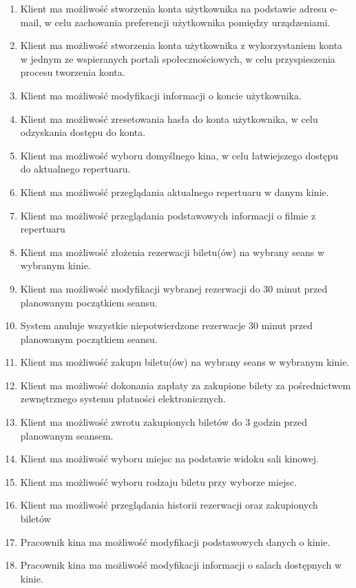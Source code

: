 \begin{enumerate}
\item Klient ma możliwość stworzenia konta użytkownika na podstawie adresu e-mail, w celu zachowania preferencji użytkownika pomiędzy urządzeniami.
\item Klient ma możliwość stworzenia konta użytkownika z wykorzystaniem konta w jednym ze wspieranych portali społecznościowych, w celu przyspieszenia procesu tworzenia konta.
\item Klient ma możliwość modyfikacji informacji o koncie użytkownika.
\item Klient ma możliwość zresetowania hasła do konta użytkownika, w celu odzyskania dostępu do konta. \newline
\item Klient ma możliwość wyboru domyślnego kina, w celu łatwiejszego dostępu do aktualnego repertuaru.
\item Klient ma możliwość przeglądania aktualnego repertuaru w danym kinie.
\item Klient ma możliwość przeglądania podstawowych informacji o filmie z repertuaru \newline
\item Klient ma możliwość złożenia rezerwacji biletu(ów) na wybrany seans w wybranym kinie.
\item Klient ma możliwość modyfikacji wybranej rezerwacji do 30 minut przed planowanym początkiem seansu.
\item System anuluje wszystkie niepotwierdzone rezerwacje 30 minut przed planowanym początkiem seansu. \newline
\item Klient ma możliwość zakupu biletu(ów) na wybrany seans w wybranym kinie.
\item Klient ma możliwość dokonania zapłaty za zakupione bilety za pośrednictwem zewnętrznego systemu płatności elektronicznych.
\item Klient ma możliwość zwrotu zakupionych biletów do 3 godzin przed planowanym seansem.
\item Klient ma możliwość wyboru miejsc na podstawie widoku sali kinowej.
\item Klient ma możliwość wyboru rodzaju biletu przy wyborze miejsc.
\item Klient ma możliwość przeglądania historii rezerwacji oraz zakupionych biletów \newline
\item Pracownik kina ma możliwość modyfikacji podstawowych danych o kinie.
\item Pracownik kina ma możliwość modyfikacji informacji o salach dostępnych w kinie.

\end{enumerate}
